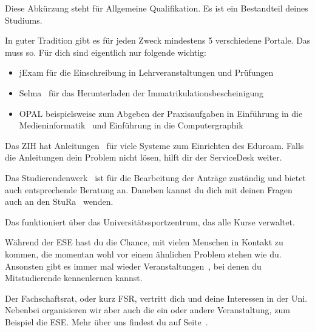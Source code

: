 Diese Abkürzung steht für Allgemeine Qualifikation. Es ist ein Bestandteil deines Studiums.~

In guter Tradition gibt es für jeden Zweck mindestens 5 verschiedene Portale. Das muss so. Für dich sind eigentlich nur folgende wichtig:
\begin{itemize}
\item jExam für die Einschreibung in Lehrveranstaltungen und Prüfungen
\item Selma~ für das Herunterladen der Immatrikulationsbescheinigung
\item OPAL beispielsweise zum Abgeben der Praxisaufgaben in Einführung in die Medieninformatik~ und Einführung in die Computergraphik~
\end{itemize}

Das ZIH hat Anleitungen~ für viele Systeme zum Einrichten des Eduroam. Falls die Anleitungen dein Problem nicht lösen, hilft dir der ServiceDesk weiter.

Das Studierendenwerk~ ist für die Bearbeitung der Anträge zuständig und bietet auch entsprechende Beratung an. Daneben kannst du dich mit deinen Fragen auch an den StuRa~ wenden.

Das funktioniert über das Universitätssportzentrum, das alle Kurse verwaltet.~ 

Während der ESE hast du die Chance, mit vielen Menschen in Kontakt zu kommen, die momentan wohl vor einem ähnlichen Problem stehen wie du.
Ansonsten gibt es immer mal wieder Veranstaltungen~, bei denen du Mitstudierende kennenlernen kannst.

Der Fachschaftsrat, oder kurz FSR, vertritt dich und deine Interessen in der Uni. Nebenbei organisieren wir aber auch die ein oder andere Veranstaltung, zum Beispiel die ESE. Mehr über uns findest du auf Seite~.

